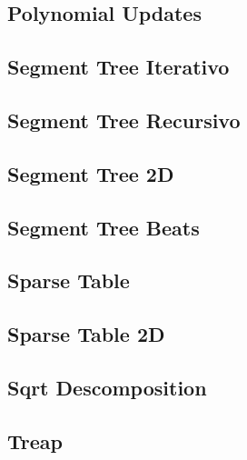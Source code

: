 \subsection{Polynomial Updates}
\raggedbottom
\hrulefill
\subsection{Segment Tree Iterativo}
\raggedbottom
\hrulefill
\subsection{Segment Tree Recursivo}
\raggedbottom
\hrulefill
\subsection{Segment Tree 2D}
\raggedbottom
\hrulefill
\subsection{Segment Tree Beats}
\raggedbottom
\hrulefill
\subsection{Sparse Table}
\raggedbottom
\hrulefill
\subsection{Sparse Table 2D}
\raggedbottom
\hrulefill
\subsection{Sqrt Descomposition}
\raggedbottom
\hrulefill
\subsection{Treap}
\raggedbottom
\hrulefill
